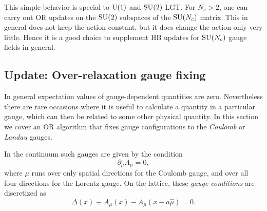This simple 
behavior is special to $\operatorname{U}(1)$ and $\operatorname{SU}(2)$ LGT. 
For $N_c>2$, one can carry out OR updates on the $\operatorname{SU}(2)$ subspaces of the
$\operatorname{SU}(N_c)$ matrix. This in general does not keep the action constant, but it
does change the action only very little. Hence it is a good choice to supplement
HB updates for $\operatorname{SU}(N_c)$ gauge fields in general. 

\subsection{Update: Over-relaxation gauge fixing}\label{sec:ORgaugefix}

In general expectation values of gauge-dependent quantities are zero.
Nevertheless there are rare occasions where it is useful to calculate
a quantity in a particular gauge, which can then be related to some
other physical quantity. In this section we cover an OR
algorithm that fixes gauge configurations to the {\it Coulomb} or 
{\it Landau} gauges.

In the continuum such gauges are given by the condition
\begin{equation}
  \partial_\mu A_\mu=0,
\end{equation}
where $\mu$ runs over only spatial directions for the Coulomb gauge, and
over all four directions for the Lorentz gauge. On the lattice, these 
{\it gauge conditions} are discretized as
\begin{equation}
  \Delta(x)\equiv A_\mu(x)-A_\mu(x-a\hat\mu) =0.
\end{equation}

